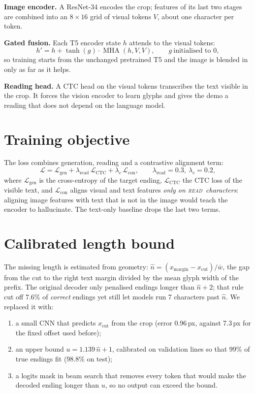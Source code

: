 \documentclass[12pt,a4paper,oneside]{report}
\newcommand{\READ}{\texorpdfstring{\textsc{read}}{READ}}
\begin{document}
\textbf{Image encoder.} A ResNet-34 encodes the crop; features of its last two stages are combined
into an $8\times16$ grid of visual tokens $V$, about one character per token.

\textbf{Gated fusion.} Each T5 encoder state $h$ attends to the visual tokens:
\begin{equation}
h' = h + \tanh(g)\cdot\operatorname{MHA}(h, V, V),\qquad g\ \text{initialised to } 0,
\end{equation}
so training starts from the unchanged pretrained T5 and the image is blended in only as far as it
helps.

\textbf{Reading head.} A CTC head on the visual tokens transcribes the text visible in the crop. It
forces the vision encoder to learn glyphs and gives the demo a reading that does not depend on the
language model.

\section{Training objective}
The loss combines generation, reading and a contrastive alignment term:
\begin{equation}
\mathcal{L} = \mathcal{L}_{\text{gen}} + \lambda_{\text{read}}\,\mathcal{L}_{\text{CTC}}
+ \lambda_{c}\,\mathcal{L}_{\text{con}},\qquad \lambda_{\text{read}}=0.3,\ \lambda_c=0.2,
\end{equation}
where $\mathcal{L}_{\text{gen}}$ is the cross-entropy of the target ending, $\mathcal{L}_{\text{CTC}}$
the CTC loss of the visible text, and $\mathcal{L}_{\text{con}}$ aligns visual and text features
\emph{only on \READ\ characters}: aligning image features with text that is not in the image would
teach the encoder to hallucinate. The text-only baseline drops the last two terms.

\section{Calibrated length bound}
The missing length is estimated from geometry: $\hat n = (x_{\text{margin}} - x_{\text{cut}})/\bar w$,
the gap from the cut to the right text margin divided by the mean glyph width of the prefix. The
original decoder only penalised endings longer than $\hat n + 2$; that rule cut off 7.6\% of
\emph{correct} endings yet still let models run 7 characters past $\hat n$. We replaced it with:
\begin{enumerate}[leftmargin=2em,itemsep=1pt]
\item a small CNN that predicts $x_{\text{cut}}$ from the crop (error 0.96\,px, against 7.3\,px for
the fixed offset used before);
\item an upper bound $u = 1.139\,\hat n + 1$, calibrated on validation lines so that 99\% of true
endings fit (98.8\% on test);
\item a logits mask in beam search that removes every token that would make the decoded ending
longer than $u$, so no output can exceed the bound.
\end{enumerate}
\end{document}
